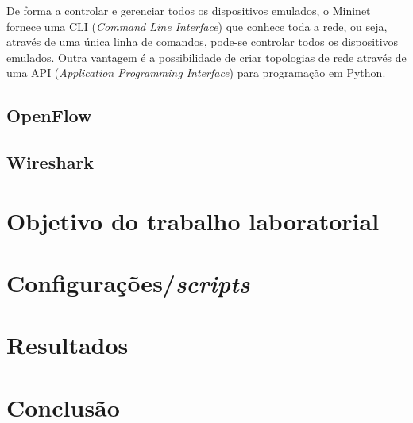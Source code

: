 De forma a controlar e gerenciar todos os dispositivos emulados, o Mininet fornece uma CLI (\textit{Command Line Interface}) que conhece toda a rede, ou seja, através de uma única linha de comandos, pode-se controlar todos os dispositivos emulados. Outra vantagem é a possibilidade de criar topologias de rede através de uma API (\textit{Application Programming Interface}) para programação em Python.

\subsection{OpenFlow} \label{openflow}



\subsection{Wireshark} \label{wireshark}


\section*{Objetivo do trabalho laboratorial}


\section*{Configurações/\textit{scripts}}


\section*{Resultados}


\section*{Conclusão}